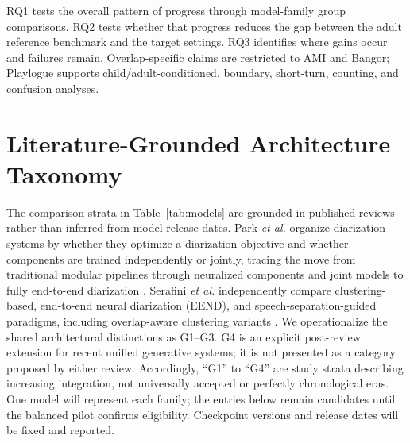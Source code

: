 \documentclass[conference,onecolumn]{IEEEtran}
\begin{document}
RQ1 tests the overall pattern of progress through model-family group
comparisons. RQ2 tests whether that progress reduces the gap between the adult
reference benchmark and the target settings. RQ3 identifies where gains occur
and failures remain. Overlap-specific claims are restricted to AMI and Bangor;
Playlogue supports child/adult-conditioned, boundary, short-turn, counting, and
confusion analyses.

\section{Literature-Grounded Architecture Taxonomy}

The comparison strata in Table~\ref{tab:models} are grounded in published
reviews rather than inferred from model release dates. Park \emph{et al.}
organize diarization systems by whether they optimize a diarization objective
and whether components are trained independently or jointly, tracing the move
from traditional modular pipelines through neuralized components and joint
models to fully end-to-end diarization \cite{park2022review}. Serafini
\emph{et al.} independently compare clustering-based, end-to-end neural
diarization (EEND), and speech-separation-guided paradigms, including
overlap-aware clustering variants \cite{serafini2023experimental}. We
operationalize the shared architectural distinctions as G1--G3. G4 is an
explicit post-review extension for recent unified generative systems; it is
not presented as a category proposed by either review. Accordingly, ``G1'' to
``G4'' are study strata describing increasing integration, not universally
accepted or perfectly chronological eras. One model will represent each
family; the entries below remain candidates until the balanced pilot confirms
eligibility. Checkpoint versions and release dates will be fixed and reported.
\end{document}
